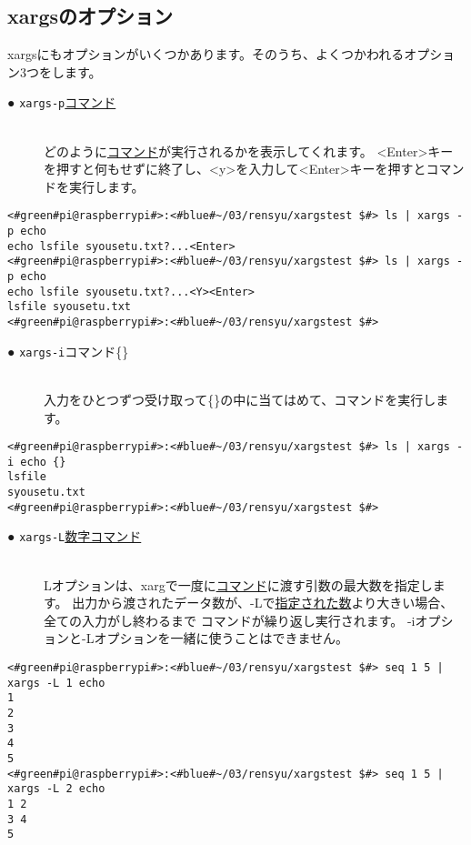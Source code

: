 \subsection{xargsのオプション}
xargsにもオプションがいくつかあります。そのうち、よくつかわれるオプション3つをします。

\begin{description}
    \item[● \texttt{xargs}\textvisiblespace \texttt{-p}\textvisiblespace \underline{コマンド}]\mbox{}\\
    どのように\underline{コマンド}が実行されるかを表示してくれます。
    <Enter>キーを押すと何もせずに終了し、<y>を入力して<Enter>キーを押すとコマンドを実行します。
\end{description}

\begin{lstlisting}[caption=xargsコマンドのオプションp]
<#green#pi@raspberrypi#>:<#blue#~/03/rensyu/xargstest $#> ls | xargs -p echo
echo lsfile syousetu.txt?...<Enter>
<#green#pi@raspberrypi#>:<#blue#~/03/rensyu/xargstest $#> ls | xargs -p echo
echo lsfile syousetu.txt?...<Y><Enter>
lsfile syousetu.txt
<#green#pi@raspberrypi#>:<#blue#~/03/rensyu/xargstest $#>
\end{lstlisting}

\begin{description}
    \item[● \texttt{xargs}\textvisiblespace \texttt{-i}\textvisiblespace コマンド\textvisiblespace \{\}]\mbox{}\\
    入力をひとつずつ受け取って\{\}の中に当てはめて、コマンドを実行します。
\end{description}

\begin{lstlisting}[caption=xargsコマンドのオプションi]
<#green#pi@raspberrypi#>:<#blue#~/03/rensyu/xargstest $#> ls | xargs -i echo {}
lsfile
syousetu.txt
<#green#pi@raspberrypi#>:<#blue#~/03/rensyu/xargstest $#>
\end{lstlisting}
\newpage
\begin{description}
    \item[● \texttt{xargs}\textvisiblespace \texttt{-L}\textvisiblespace\underline{数字}\textvisiblespace\underline{コマンド}]\mbox{}\\
    Lオプションは、xargで一度に\underline{コマンド}に渡す引数の最大数を指定します。
    出力から渡されたデータ数が、-Lで\underline{指定された数}より大きい場合、全ての入力がし終わるまで
    コマンドが繰り返し実行されます。
    -iオプションと-Lオプションを一緒に使うことはできません。
\end{description}
\begin{lstlisting}[caption=xargsコマンドのオプションL]
<#green#pi@raspberrypi#>:<#blue#~/03/rensyu/xargstest $#> seq 1 5 | xargs -L 1 echo
1
2
3
4
5
<#green#pi@raspberrypi#>:<#blue#~/03/rensyu/xargstest $#> seq 1 5 | xargs -L 2 echo
1 2
3 4
5
\end{lstlisting}

